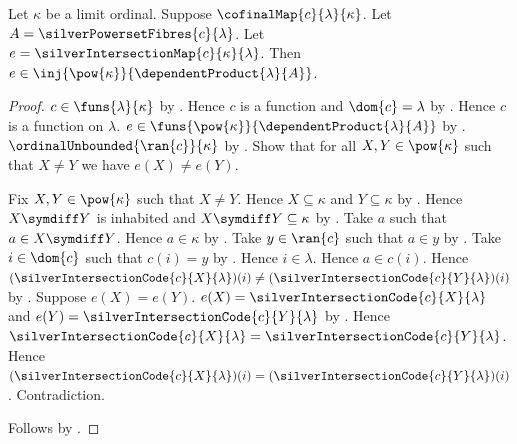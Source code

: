 \begin{theorem}\label{silver_intersection_map_injection}
    Let $\kappa$ be a limit ordinal.
    Suppose $\cofinalMap{c}{\lambda}{\kappa}$.
    Let $A=\silverPowersetFibres{c}{\lambda}$.
    Let $e=\silverIntersectionMap{c}{\kappa}{\lambda}$.
    Then $e\in\inj{\pow{\kappa}}{\dependentProduct{\lambda}{A}}$.
\end{theorem}
\begin{proof}
    $c\in\funs{\lambda}{\kappa}$ by .
    Hence $c$ is a function and $\dom{c}=\lambda$
        by .
    Hence $c$ is a function on $\lambda$.
    $e\in\funs{\pow{\kappa}}{\dependentProduct{\lambda}{A}}$
        by .
    $\ordinalUnbounded{\ran{c}}{\kappa}$
        by .
    Show that for all $X,Y\in\pow{\kappa}$ such that $X\neq Y$ we have
        $e(X)\neq e(Y)$.
    \begin{subproof}
        Fix $X,Y\in\pow{\kappa}$ such that $X\neq Y$.
        Hence $X\subseteq\kappa$ and $Y\subseteq\kappa$
            by .
        Hence $X\symdiff Y$ is inhabited and
            $X\symdiff Y\subseteq\kappa$
            by .
        Take $a$ such that $a\in X\symdiff Y$.
        Hence $a\in\kappa$ by .
        Take $y\in\ran{c}$ such that $a\in y$
            by .
        Take $i\in\dom{c}$ such that $c(i)=y$
            by .
        Hence $i\in\lambda$.
        Hence $a\in c(i)$.
        Hence $(\silverIntersectionCode{c}{X}{\lambda})(i)
            \neq(\silverIntersectionCode{c}{Y}{\lambda})(i)$
            by .
        Suppose $e(X)=e(Y)$.
        $e(X)=\silverIntersectionCode{c}{X}{\lambda}$ and
            $e(Y)=\silverIntersectionCode{c}{Y}{\lambda}$
            by .
        Hence $\silverIntersectionCode{c}{X}{\lambda}
            =\silverIntersectionCode{c}{Y}{\lambda}$.
        Hence $(\silverIntersectionCode{c}{X}{\lambda})(i)
            =(\silverIntersectionCode{c}{Y}{\lambda})(i)$.
        Contradiction.
    \end{subproof}
    Follows by .
\end{proof}

